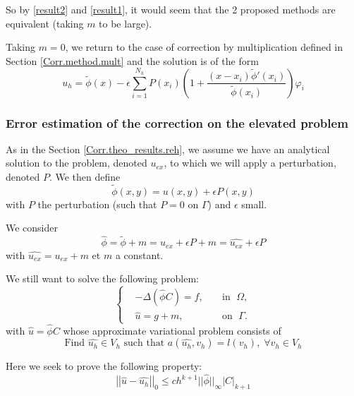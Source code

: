 So by \ref{result2} and \ref{result1}, it would seem that the 2 proposed methods are equivalent (taking $m$ to be large).

\begin{Rem}
	Taking $m=0$, we return to the case of correction by multiplication defined in Section \ref{Corr.method.mult} and the solution is of the form
	\begin{equation*}
		u_h=\tilde{\phi}(x)-\epsilon\sum_{i=1}^{N_h}P(x_i)\left(1+\frac{(x-x_i)\tilde{\phi}'(x_i)}{\tilde{\phi}(x_i)}\right)\varphi_i
	\end{equation*}
\end{Rem}

\subsubsection{Error estimation of the correction on the elevated problem} \label{Corr.theo_results.error_reh}

As in the Section \ref{Corr.theo_results.reh}, we assume we have an analytical solution to the problem, denoted $u_{ex}$, to which we will apply a perturbation, denoted $P$. We then define
\begin{equation*}
	\tilde{\phi}(x,y) = u(x,y)+\epsilon P(x,y)
\end{equation*}
with $P$ the perturbation (such that $P=0$ on $\Gamma$) and $\epsilon$ small.

We consider
$$\hat{\phi}=\tilde{\phi}+m=u_{ex}+\epsilon P+m=\hat{u_{ex}}+\epsilon P$$
with $\hat{u_{ex}}=u_{ex}+m$ et $m$ a constant.

We still want to solve the following problem:
\begin{equation*}
	\left\{\begin{aligned}
		&-\Delta (\hat{\phi}C)=f, \; &&\text{in } \; \Omega, \\
		&\hat{u}=g+m, \; &&\text{on } \; \Gamma.
	\end{aligned}\right. \label{pb_reh} %
\end{equation*}
with $\hat{u}=\hat{\phi}C$ whose approximate variational problem consists of
\begin{equation*}
	\text{Find } \hat{u_h}\in V_h \text{ such that } a(\hat{u_h},v_h)=l(v_h), \;\forall v_h\in V_h
\end{equation*}

Here we seek to prove the following property:
\begin{equation*}
	\left|\left|\hat{u}-\hat{u_h}\right|\right|_0\le ch^{k+1}||\hat{\phi}||_\infty\left|C\right|_{k+1}
\end{equation*}

